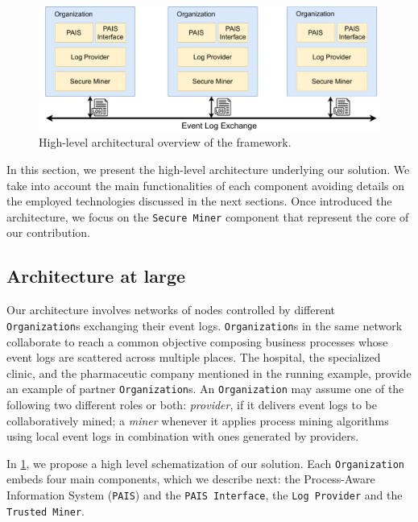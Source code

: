 \begin{figure}[t]
\centering
\includegraphics[width=13cm]{content/figures/architecture_diagram.pdf}
\caption{High-level architectural overview of the framework.}
\label{fig:architecture_diagram}
\end{figure}
In this section, we present the high-level architecture underlying our solution. We take into account the main functionalities of each component avoiding details on the employed technologies discussed in the next sections. Once introduced the architecture, we focus on the \texttt{Secure Miner} component that represent the core of our contribution.

\subsection{Architecture at large}
Our architecture involves networks of nodes controlled by different \texttt{Organization}s exchanging their event logs. \texttt{Organization}s in the same network collaborate to reach a common objective composing business processes whose event logs are scattered across multiple places. The hospital, the specialized clinic, and the pharmaceutic company mentioned in the running example, provide an example of partner \texttt{Organization}s. An \texttt{Organization} may assume one of the following two different roles or both: \textit{provider}, if it delivers event logs to be collaboratively mined; a \textit{miner} whenever it applies process mining algorithms using local event logs in combination with ones generated by providers. %

In \cref{fig:architecture_diagram}, we propose a high level schematization of our solution. Each \texttt{Organization} embeds four main components, which we describe next: the Process-Aware Information System (\texttt{PAIS}) and the \texttt{PAIS Interface}, the \texttt{Log Provider} and the \texttt{Trusted Miner}.


